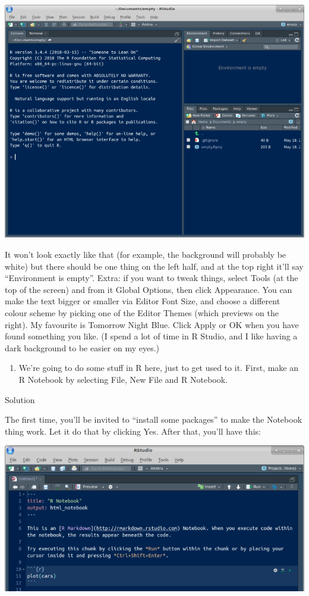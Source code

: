\documentclass[]{tufte-book}
\providecommand{\tightlist}{%
  \setlength{\itemsep}{0pt}\setlength{\parskip}{0pt}}
\theoremstyle{definition}
\theoremstyle{definition}
\theoremstyle{definition}
\theoremstyle{remark}
\begin{document}
\includegraphics{empty.png}

It won't look exactly like that (for example, the background will
probably be white) but there should be one thing on the left half, and
at the top right it'll say ``Environment is empty''. Extra: if you want
to tweak things, select Tools (at the top of the screen) and from it
Global Options, then click Appearance. You can make the text bigger or
smaller via Editor Font Size, and choose a different colour scheme by
picking one of the Editor Themes (which previews on the right). My
favourite is Tomorrow Night Blue. Click Apply or OK when you have found
something you like. (I spend a lot of time in R Studio, and I like
having a dark background to be easier on my eyes.)

\begin{enumerate}
\def\labelenumi{(\alph{enumi})}
\setcounter{enumi}{1}
\tightlist
\item
  We're going to do some stuff in R here, just to get used to it. First,
  make an R Notebook by selecting File, New File and R Notebook.
\end{enumerate}

Solution

The first time, you'll be invited to ``install some packages'' to make
the Notebook thing work. Let it do that by clicking Yes. After that,
you'll have this:

\includegraphics{rnote1.png}
\end{document}
